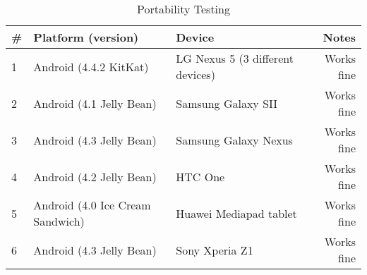 \begin{table}[!htp]
\begin{center}
	\begin{tabular}{ | l | l | l | r | }
	\hline
	 \#	& Platform (version)			&Device					& Notes \\ \hline
	 1	&Android (4.4.2 KitKat)			&LG Nexus 5 (3 different devices)	& Works fine\\ \hline
	 2	&Android (4.1 Jelly Bean)			&Samsung Galaxy SII			& Works fine\\ \hline
	 3	&Android (4.3 Jelly Bean)			&Samsung Galaxy Nexus			& Works fine\\ \hline
	 4	&Android (4.2 Jelly Bean)			&HTC One					& Works fine\\ \hline
	 5	&Android (4.0 Ice Cream Sandwich)	&Huawei Mediapad tablet			& Works fine\\ \hline
	 6	&Android (4.3 Jelly Bean)			&Sony Xperia Z1				& Works fine\\
	 \hline
	 \end{tabular}
\end{center}
\caption{Portability Testing}
\label{tab:Portability Testing}
\end{table}
